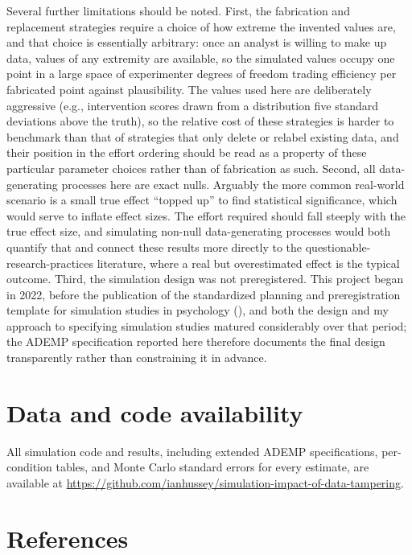 \documentclass[
  nonatbib,
  authoryear,
  preprint]{elsarticle}
\begin{document}
Several further limitations should be noted. First, the fabrication and
replacement strategies require a choice of how extreme the invented
values are, and that choice is essentially arbitrary: once an analyst is
willing to make up data, values of any extremity are available, so the
simulated values occupy one point in a large space of experimenter
degrees of freedom trading efficiency per fabricated point against
plausibility. The values used here are deliberately aggressive (e.g.,
intervention scores drawn from a distribution five standard deviations
above the truth), so the relative cost of these strategies is harder to
benchmark than that of strategies that only delete or relabel existing
data, and their position in the effort ordering should be read as a
property of these particular parameter choices rather than of
fabrication as such. Second, all data-generating processes here are
exact nulls. Arguably the more common real-world scenario is a small
true effect ``topped up'' to find statistical significance, which would
serve to inflate effect sizes. The effort required should fall steeply
with the true effect size, and simulating non-null data-generating
processes would both quantify that and connect these results more
directly to the questionable-research-practices literature, where a real
but overestimated effect is the typical outcome. Third, the simulation
design was not preregistered. This project began in 2022, before the
publication of the standardized planning and preregistration template
for simulation studies in psychology
(), and both the
design and my approach to specifying simulation studies matured
considerably over that period; the ADEMP specification reported here
therefore documents the final design transparently rather than
constraining it in advance.

\section*{Data and code availability}\label{data-and-code-availability}

All simulation code and results, including extended ADEMP
specifications, per-condition tables, and Monte Carlo standard errors
for every estimate, are available at
\url{https://github.com/ianhussey/simulation-impact-of-data-tampering}.

\section*{References}\label{references}
\end{document}
